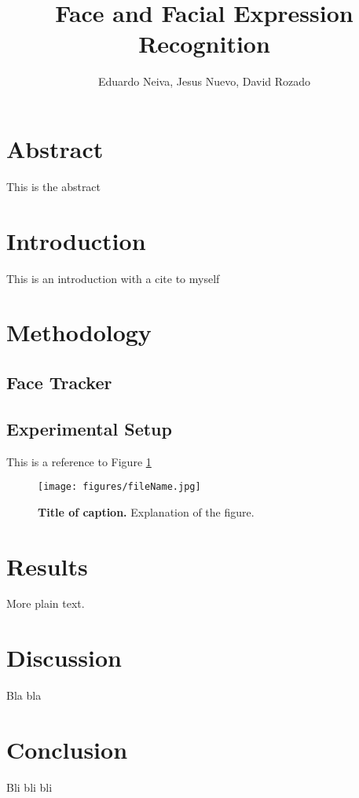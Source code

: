 \documentclass[]{article}
\title{Face and Facial Expression Recognition}
\author{Eduardo Neiva, Jesus Nuevo, David Rozado}
\begin{document}
\maketitle

\section{Abstract}
This is the abstract

\section{Introduction}
This is an introduction with a cite to myself \cite{Rozado2012a}

\section{Methodology}
\subsection{Face Tracker}

\subsection{Experimental Setup}
This is a reference to Figure \ref{figureLabel}

\begin{figure}[ht]
\begin{center}
\vspace{-3mm}
\texttt{[image: figures/fileName.jpg]}
\end{center}
\caption{\textbf{Title of caption.} Explanation of the figure.}
\label{figureLabel}
\end{figure}


\section{Results}
More plain text.

\section{Discussion}
Bla bla

\section{Conclusion}
Bli bli bli



\end{document}
